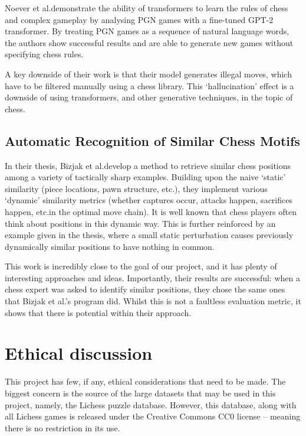 Noever et al.\@ demonstrate the ability of transformers to learn the rules of
chess and complex gameplay by analysing PGN games with a fine-tuned GPT-2
transformer.\cite{chessTransformer} By treating PGN games as a sequence of
natural language words, the authors show successful results and are able to
generate new games without specifying chess rules.

A key downside of their work is that their model generates illegal moves, which
have to be filtered manually using a chess library.\cite{chessTransformer} This
`hallucination' effect is a downside of using transformers, and other
generative techniques, in the topic of chess. 

\subsection{Automatic Recognition of Similar Chess Motifs} \label{chessMotifsOverview}

In their thesis,\cite{chessMotifs} Bizjak et al.\@ develop a method to retrieve
similar chess positions among a variety of tactically sharp examples. Building
upon the naive `static' similarity (piece locations, pawn structure, etc.\@),
they implement various `dynamic' similarity metrics (whether captures occur,
attacks happen, sacrifices happen, etc.\@ in the optimal move chain). It is
well known \cite{thoughtAndChoice}\cite{bilalic2010mechanisms} that chess
players often think about positions in this dynamic way. This is further
reinforced by an example given in the thesis, where a small static perturbation
causes previously dynamically similar positions to have nothing in
common.\cite{chessMotifs}

This work is incredibly close to the goal of our project, and it has plenty of
interesting approaches and ideas. Importantly, their results are successful:
when a chess expert was asked to identify similar positions, they chose the
same ones that Bizjak et al.\@'s program did.\cite{chessMotifs} Whilst this is
not a faultless evaluation metric, it shows that there is potential within
their approach.


\section{Ethical discussion}

This project has few, if any, ethical considerations that need to be made. The
biggest concern is the source of the large datasets that may be used in this
project, namely, the Lichess puzzle database.\cite{lichessPuzzles} However,
this database, along with all Lichess games is released under the Creative
Commons CC0 license -- meaning there is no restriction in its use.

